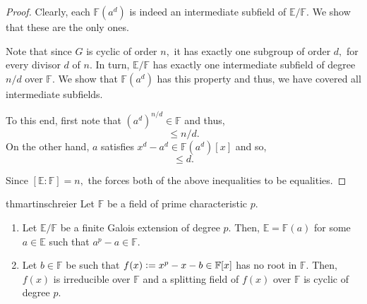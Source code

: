 \subfieldsofprimcyclic*\label{prop:subfieldsofprimcyclic2}
\begin{flushright}\hyperref[prop:subfieldsofprimcyclic]{\upsym}\end{flushright}
\begin{proof}
    Clearly, each $\mathbb{F}(a^d)$ is indeed an intermediate subfield of $\mathbb{E}/\mathbb{F}.$ We show that these are the only ones.

    Note that since $G$ is cyclic of order $n,$ it has exactly one subgroup of order $d,$ for every divisor $d$ of $n.$ In turn, $\mathbb{E}/\mathbb{F}$ has exactly one intermediate subfield of degree $n/d$ over $\mathbb{F}.$ We show that $\mathbb{F}(a^d)$ has this property and thus, we have covered all intermediate subfields.

    To this end, first note that $(a^d)^{n/d} \in \mathbb{F}$ and thus,
    \begin{equation*} 
        [\mathbb{F}(a^d) : \mathbb{F}] \le n/d.
    \end{equation*}
    On the other hand, $a$ satisfies $x^d - a^d \in \mathbb{F}(a^d)[x]$ and so,
    \begin{equation*} 
        [\mathbb{E} : \mathbb{F}(a^d)] \le d.
    \end{equation*}

    Since $[\mathbb{E} : \mathbb{F}] = n,$ the  forces both of the above inequalities to be equalities.
\end{proof}

\begin{restatable}{thm}{artinschreier}
\label{thm:artinschreier}
    Let $\mathbb{F}$ be a field of prime characteristic $p.$
    \begin{enumerate}
        \item Let $\mathbb{E}/\mathbb{F}$ be a finite Galois extension of degree $p.$ Then, $\mathbb{E} = \mathbb{F}(a)$ for some $a \in \mathbb{E}$ such that $a^p - a \in \mathbb{F}.$
        \item Let $b \in \mathbb{F}$ be such that $f(x) \vcentcolon= x^p - x - b \in \mathbb{F}[x]$ has no root in $\mathbb{F}.$ Then, $f(x)$ is irreducible over $\mathbb{F}$ and a splitting field of $f(x)$ over $\mathbb{F}$ is cyclic of degree $p.$ \hfill\hyperref[thm:artinschreier2]{\downsym}
    \end{enumerate} 
\end{restatable}

